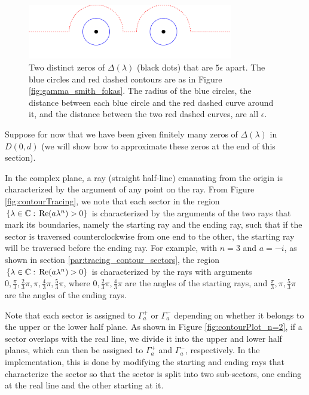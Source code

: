 \documentclass[12pt, oneside, a4paper]{article}
\begin{document}
\begin{figure}[htpb!]
    \centering
    \includegraphics[width=0.8\textwidth]{epsilon_ps.png}
    \caption{Two distinct zeros of $\Delta(\lambda)$ (black dots) that are $5\epsilon$ apart. The blue circles and red dashed contours are as in Figure \ref{fig:gamma_smith_fokas}. The radius of the blue circles, the distance between each blue circle and the red dashed curve around it, and the distance between the two red dashed curves, are all $\epsilon$.}
    \label{fig:epsilon}
\end{figure}

Suppose for now that we have been given finitely many zeros of $\Delta(\lambda)$ in $D(0, d)$ (we will show how to approximate these zeros at the end of this section).

In the complex plane, a ray (straight half-line) emanating from the origin is characterized by the argument of any point on the ray. From Figure \ref{fig:contourTracing}, we note that each sector in the region $\{\lambda\in\mathbb C:\, \mathrm{Re}(a\lambda^n)>0\}$ is characterized by the arguments of the two rays that mark its boundaries, namely the starting ray and the ending ray, such that if the sector is traversed counterclockwise from one end to the other, the starting ray will be traversed before the ending ray. For example, with $n=3$ and $a=-i$, as shown in section \ref{par:tracing_contour_sectors}, the region $\{\lambda\in\mathbb C:\, \mathrm{Re}(a\lambda^n)>0\}$ is characterized by the rays with arguments $0, \frac{\pi}{3}, \frac{2}{3}\pi, \pi, \frac{4}{3}\pi, \frac{5}{3}\pi$, where $0, \frac{2}{3}\pi, \frac{4}{3}\pi$ are the angles of the starting rays, and $\frac{\pi}{3}, \pi, \frac{5}{3}\pi$ are the angles of the ending rays. 

Note that each sector is assigned to $\Gamma_a^+$ or $\Gamma_a^-$ depending on whether it belongs to the upper or the lower half plane. As shown in Figure \ref{fig:contourPlot_n=2}, if a sector overlaps with the real line, we divide it into the upper and lower half planes, which can then be assigned to $\Gamma_a^+$ and $\Gamma_a^-$, respectively. In the implementation, this is done by modifying the starting and ending rays that characterize the sector so that the sector is split into two sub-sectors, one ending at the real line and the other starting at it.
\end{document}
